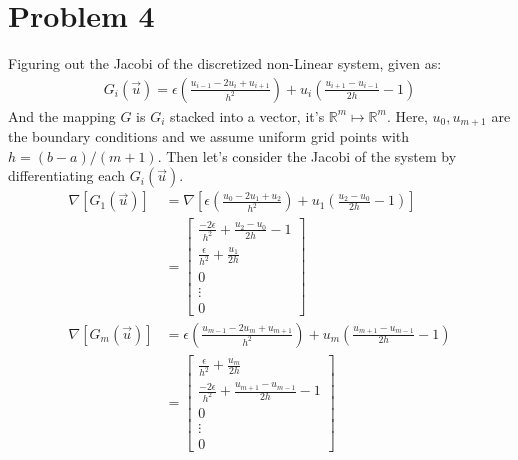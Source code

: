 \documentclass[]{article}
\begin{document}
\section*{Problem 4}
    Figuring out the Jacobi of the discretized non-Linear system, given as: 
    \begin{align*}\tag{4.1}\label{eqn:4.1}
        G_i(\vec{u}) = \epsilon \left(
            \frac{u_{i - 1} - 2u_i + u_{i + 1}}{h^2}
        \right) + 
        u_i \left(
            \frac{u_{i + 1} - u_{i - 1}}{2h} - 1
        \right)
    \end{align*}
    And the mapping $G$ is $G_i$ stacked into a vector, it's $\mathbb{R}^m \mapsto \mathbb{R}^m$. Here, $u_{0}, u_{m + 1}$ are the boundary conditions and we assume uniform grid points with $h = (b - a)/(m + 1)$. Then let's consider the Jacobi of the system by differentiating each $G_i(\vec{u})$. 
    \begin{align*}\tag{4.2}\label{eqn:4.2}
        \nabla[G_1(\vec{u})] &= 
        \nabla 
        \left[
            \epsilon \left(
            \frac{u_{0} - 2u_1 + u_{2}}{h^2}
            \right) + 
            u_1 \left(
                \frac{u_{2} - u_{0}}{2h} - 1
            \right)
        \right]
        \\
        &= \begin{bmatrix}
            \frac{-2\epsilon}{h^2} + \frac{u_2 - u_0}{2h} - 1
            \\[0.5em]
            \frac{\epsilon}{h^2} + \frac{u_1}{2h}
            \\[0.5em]
            0
            \\[0.5em]
            \vdots 
            \\[0.5em]
            0
        \end{bmatrix}
        \\
        \nabla[G_m(\vec{u})] &= 
        \epsilon \left(
            \frac{u_{m - 1} - 2u_m + u_{m + 1}}{h^2}
        \right) + u_m \left(
            \frac{u_{m + 1} - u_{m - 1}}{2h} - 1
        \right)
        \\
        &= 
        \begin{bmatrix}
            \frac{\epsilon}{h^2} + \frac{u_m}{2h}
            \\[0.5em]
            \frac{-2\epsilon}{h^2} + \frac{u_{m + 1} - u_{m - 1}}{2h} - 1
            \\[0.5em]
            0
            \\[0.5em]
            \vdots 
            \\[0.5em]
            0
        \end{bmatrix}
    \end{align*}
\end{document}
